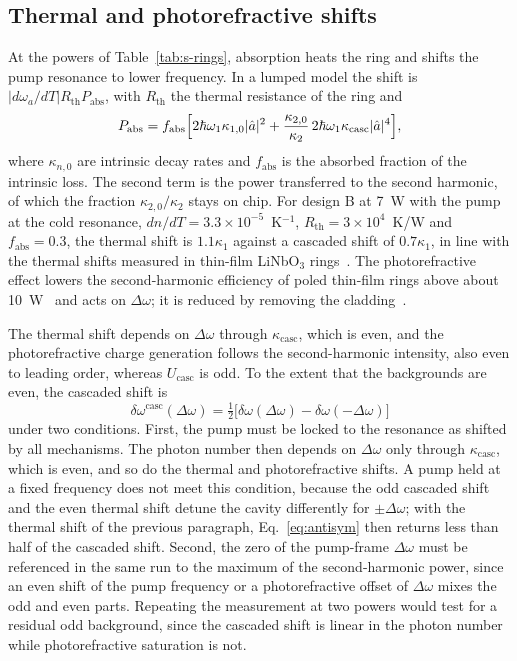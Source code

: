 \documentclass[9pt]{osa-supplemental-document}
\newcommand{\Dom}{\Delta\omega}
\begin{document}
\subsection{Thermal and photorefractive shifts}

At the powers of Table~\ref{tab:s-rings}, absorption heats the ring and
shifts the pump resonance to lower frequency.  In a lumped model the shift
is $|d\omega_a/dT|R_{\mathrm{th}}P_{\mathrm{abs}}$, with $R_{\mathrm{th}}$
the thermal resistance of the ring and
\begin{equation}
  P_{\mathrm{abs}}=f_{\mathrm{abs}}\Bigl[2\hbar\omega_1\kappa_{1,0}|\hat a|^2
  +\frac{\kappa_{2,0}}{\kappa_2}\,2\hbar\omega_1\kappa_{\mathrm{casc}}|\hat a|^4\Bigr],
\end{equation}
where $\kappa_{n,0}$ are intrinsic decay rates and $f_{\mathrm{abs}}$ is the
absorbed fraction of the intrinsic loss.  The second term is the power
transferred to the second harmonic, of which the fraction
$\kappa_{2,0}/\kappa_2$ stays on chip.  For design B at 7~\textmu W with
the pump at the cold resonance, $dn/dT=3.3\times10^{-5}$~K$^{-1}$, $R_{\mathrm{th}}=3\times10^4$~K/W and
$f_{\mathrm{abs}}=0.3$, the thermal shift is $1.1\kappa_1$ against a
cascaded shift of $0.7\kappa_1$, in line with the thermal shifts measured in
thin-film LiNbO$_3$ rings~\cite{sun2017}.  The photorefractive effect lowers the
second-harmonic efficiency of poled thin-film rings above about
10~\textmu W~\cite{lu2020} and acts on $\Dom$; it is reduced by removing
the cladding~\cite{xu2021}.

The thermal shift depends on $\Dom$ through $\kappa_{\mathrm{casc}}$, which
is even, and the photorefractive charge generation follows the
second-harmonic intensity, also even to leading order, whereas
$U_{\mathrm{casc}}$ is odd.  To the extent that the backgrounds are even,
the cascaded shift is
\begin{equation}
  \delta\omega^{\mathrm{casc}}(\Dom)=\tfrac12\bigl[\delta\omega(\Dom)-\delta\omega(-\Dom)\bigr]
  \label{eq:antisym}
\end{equation}
under two conditions.  First, the pump must be locked to the resonance as
shifted by all mechanisms.  The photon number then depends on $\Dom$ only
through $\kappa_{\mathrm{casc}}$, which is even, and so do the thermal and
photorefractive shifts.  A pump held at a fixed frequency does not meet
this condition, because
the odd cascaded shift and the even thermal shift detune the cavity
differently for $\pm\Dom$; with the thermal shift of the previous
paragraph, Eq.~\eqref{eq:antisym} then returns less than half of the cascaded
shift.  Second, the zero of the pump-frame $\Dom$ must be referenced in the
same run to the maximum of the second-harmonic power, since an even shift
of the pump frequency or a photorefractive offset of $\Dom$ mixes the odd
and even parts.  Repeating the measurement at two powers would test for a
residual odd background, since the cascaded shift is linear in the photon
number while photorefractive saturation is not.
\end{document}
